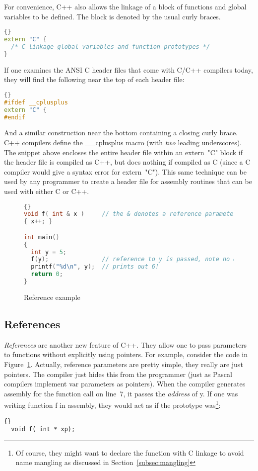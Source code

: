 For convenience, C++ also allows the linkage of a block of functions
and global variables to be defined. The block is denoted by the
usual curly braces.
\begin{lstlisting}[stepnumber=0,language=C++]{}
extern "C" {
  /* C linkage global variables and function prototypes */
}
\end{lstlisting}

If one examines the ANSI C header files that come with C/C++ compilers
today, they will find the following near the top of each header file:
\begin{lstlisting}[stepnumber=0,language=C++]{}
#ifdef __cplusplus
extern "C" {
#endif
\end{lstlisting}
\noindent And a similar construction near the bottom containing a
closing curly brace.  C++ compilers define the {\code \_\_cplusplus}
macro (with \emph{two} leading underscores). The snippet above
encloses the entire header file within an {\code extern~"C"} block if
the header file is compiled as C++, but does nothing if compiled as C
(since a C compiler would give a syntax error for {\code extern~"C"}).
This same technique can be used by any programmer to create a header
file for assembly routines that can be used with either C or C++.

\begin{figure}
\begin{lstlisting}[language=C++,frame=tlrb]{}
void f( int & x )     // the & denotes a reference parameter
{ x++; }

int main()
{
  int y = 5;
  f(y);               // reference to y is passed, note no & here!
  printf("%d\n", y);  // prints out 6!
  return 0;
}
\end{lstlisting}
\caption{Reference example \label{fig:refex}}
\end{figure}

\subsection{References}

\emph{References} are another new feature of C++. They allow one to
pass parameters to functions without explicitly using pointers. For
example, consider the code in Figure~\ref{fig:refex}. Actually,
reference parameters are pretty simple, they really are just pointers.
The compiler just hides this from the programmer (just as Pascal compilers
implement {\code var} parameters as pointers). When the compiler generates
assembly for the function call on line~7, it passes the \emph{address} of 
{\code y}. If one was writing function {\code f} in assembly, they would
act as if the prototype was\footnote{Of course, they might want to
declare the function with C linkage to avoid name mangling as discussed
in Section~\ref{subsec:mangling}}:
\begin{lstlisting}[stepnumber=0]{}
  void f( int * xp);
\end{lstlisting}

